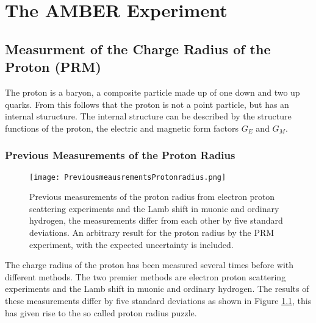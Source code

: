 \chapter{The AMBER Experiment}\label{cha:theory}

\noindent
\section{Measurment of the Charge Radius of the Proton (PRM)}\label{sec:proton_radius}
The proton is a baryon, a composite particle made up of one down and two up quarks.
From this follows that the proton is not a point particle, but has an internal sturucture.\autocite{Workman:2836514}
\newline
The internal structure can be described by the structure functions of the proton, 
the electric and magnetic form factors $G_E$ and $G_M$.\autocite{ProposalAmber}	
\subsection{Previous Measurements of the Proton Radius}
\begin{figure}[h]
	\centering
	\texttt{[image: PreviousmeausrementsProtonradius.png]}
	\caption{Previous measurements of the proton radius from electron proton scattering experiments and the Lamb shift in muonic and ordinary hydrogen,
	 the measurements differ from each other by five standard deviations. An arbitrary result for the proton radius by the PRM experiment, with the expected uncertainty is included.\autocite{ProposalAmber} }
	\label{fig:previous_proton_radius}
\end{figure}

The charge radius of the proton has been measured several times before with different methods.
The two premier methods are electron proton scattering experiments and the Lamb shift in muonic and ordinary hydrogen.
The results of these measurements differ by five standard deviations as shown in Figure \ref{fig:previous_proton_radius},
this has given rise to the so called proton radius puzzle.\autocite{ProposalAmber}

